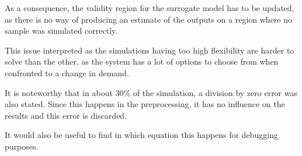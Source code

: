 
As a consequence, the validity region for the surrogate model has to be updated, as there is no way of producing an estimate of the outputs on a region where no sample was simulated correctly.

This issue interpreted as the simulations having too high flexibility are harder to solve than the other, as the system has a lot of options to choose from when confronted to a change in demand.

It is noteworthy that in about 30\% of the simulation, a division by zero error was also stated. Since this happens in the preprocessing, it has no influence on the results and this error is discarded.

It would also be useful to find in which equation this happens for debugging purposes.




